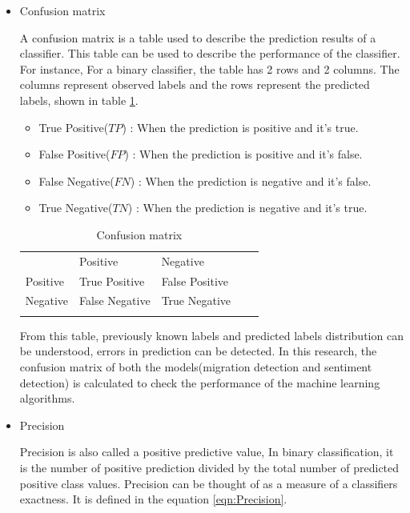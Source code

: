 \begin{itemize}
 \item Confusion matrix
 
 A confusion matrix is a table used to describe the prediction results of a classifier. This table can be used to describe the performance of the classifier. For instance, For a binary classifier, the table has 2 rows and 2 columns. The columns represent observed labels and the rows represent the predicted labels, shown in table \ref{tab:confusionmatrix}.
 
 \begin{itemize}
     \item True Positive($TP$) : When the prediction is positive and it’s true.
     \item False Positive($FP$) : When the prediction is positive and it’s false.
     \item False Negative($FN$) : When the prediction is negative and it’s false.
     \item True Negative($TN$) : When the prediction is negative and it’s true.
 \end{itemize}
 
\begin{table}[]
\centering
\begin{tabular}{lllll}
\cline{1-3}
\multicolumn{1}{|l|}{}   & \multicolumn{1}{l|}{Positive} & \multicolumn{1}{l|}{Negative}  &  &  \\ \cline{1-3}
\multicolumn{1}{|l|}{Positive} & \multicolumn{1}{l|}{True Positive}  & \multicolumn{1}{l|}{False Positive} &  &  \\ \cline{1-3}
\multicolumn{1}{|l|}{Negative}   & \multicolumn{1}{l|}{False Negative}  & \multicolumn{1}{l|}{True Negative}  &  &  \\ \cline{1-3}
                            &                           &                           &  & 
\end{tabular}
\caption{Confusion matrix}
\label{tab:confusionmatrix}
\end{table}
  From this table, previously known labels and predicted labels distribution can be understood, errors in prediction can be detected. In this research, the confusion matrix of both the models(migration detection and sentiment detection) is calculated to check the performance of the machine learning algorithms.
 
    \item Precision
    
    Precision is also called a positive predictive value, In binary classification, it is the number of positive prediction divided by the total number of predicted positive class values. Precision can be thought of as a measure of a classifiers exactness. It is defined in the equation \ref{eqn:Precision}. 
    

\end{itemize}
